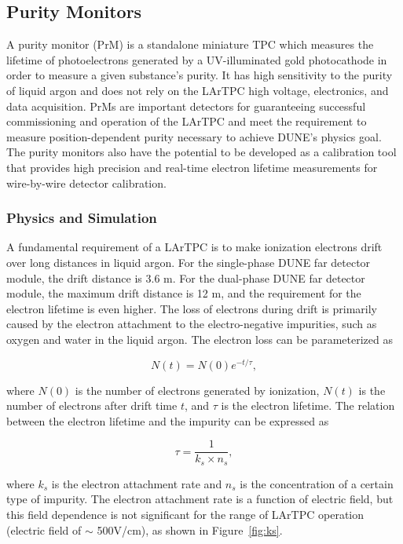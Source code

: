 \subsection{Purity Monitors}
\label{sec:fdsp-slow-cryo-purity-mon}
A purity monitor (PrM) is a standalone miniature TPC which measures the lifetime of photoelectrons generated by a UV-illuminated gold photocathode in order to measure a given substance's purity. It has high sensitivity to the purity of liquid argon and does not rely on the LArTPC high voltage, electronics, and data acquisition. PrMs are important detectors for guaranteeing successful commissioning and operation of the LArTPC and meet the requirement to measure position-dependent purity necessary to achieve DUNE's physics goal. The purity monitors also have the potential to be developed as a calibration tool that provides high precision and real-time electron lifetime measurements for wire-by-wire detector calibration. 


\subsubsection{Physics and Simulation}

A fundamental requirement of a LArTPC is to make ionization electrons drift over long distances in liquid argon. For the single-phase DUNE far detector module, the drift distance is 3.6 m. For the dual-phase DUNE far detector module, the maximum drift distance is 12 m, and the requirement for the electron lifetime is even higher. The loss of electrons during drift is primarily caused by the electron attachment to the electro-negative impurities, such as oxygen and water in the liquid argon. The electron loss can be parameterized as

$$N(t) = N(0)e^{-t/\tau},$$

where $N(0)$ is the number of electrons generated by ionization, $N(t)$ is the number of electrons after drift time $t$, and $\tau$ is the electron lifetime. The relation between the electron lifetime and the impurity can be expressed as

$$\tau = \frac{1}{k_s\times n_s},$$

where $k_s$ is the electron attachment rate and $n_s$ is the concentration of a certain type of impurity. The electron attachment rate is a function of electric field, but this field dependence is not significant for the range of LArTPC operation (electric field of $\sim$ 500V/cm), as shown in Figure~\ref{fig:ks}.

